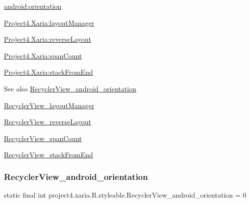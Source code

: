 {\ttfamily \hyperlink{classproject4_1_1xaria_1_1R_1_1styleable_a6b1fb1c1d7e84b9198ebbe7e20465f86}{android\+:orientation}}

{\ttfamily \hyperlink{classproject4_1_1xaria_1_1R_1_1styleable_aa9cec08b1f2e28b73fb9eed845399b00}{Project4.\+Xaria\+:layout\+Manager}}

{\ttfamily \hyperlink{classproject4_1_1xaria_1_1R_1_1styleable_a3ea954156e7ab808e833eaff0274d45f}{Project4.\+Xaria\+:reverse\+Layout}}

{\ttfamily \hyperlink{classproject4_1_1xaria_1_1R_1_1styleable_a7ecd16415effb7a235b31c1193ed8b2f}{Project4.\+Xaria\+:span\+Count}}

{\ttfamily \hyperlink{classproject4_1_1xaria_1_1R_1_1styleable_a1ef8e9797ba63acf022ba0898d24b5a1}{Project4.\+Xaria\+:stack\+From\+End}}

\begin{DoxySeeAlso}{See also}
\hyperlink{classproject4_1_1xaria_1_1R_1_1styleable_a6b1fb1c1d7e84b9198ebbe7e20465f86}{Recycler\+View\+\_\+android\+\_\+orientation} 

\hyperlink{classproject4_1_1xaria_1_1R_1_1styleable_aa9cec08b1f2e28b73fb9eed845399b00}{Recycler\+View\+\_\+layout\+Manager} 

\hyperlink{classproject4_1_1xaria_1_1R_1_1styleable_a3ea954156e7ab808e833eaff0274d45f}{Recycler\+View\+\_\+reverse\+Layout} 

\hyperlink{classproject4_1_1xaria_1_1R_1_1styleable_a7ecd16415effb7a235b31c1193ed8b2f}{Recycler\+View\+\_\+span\+Count} 

\hyperlink{classproject4_1_1xaria_1_1R_1_1styleable_a1ef8e9797ba63acf022ba0898d24b5a1}{Recycler\+View\+\_\+stack\+From\+End} 
\end{DoxySeeAlso}
\mbox{\label{classproject4_1_1xaria_1_1R_1_1styleable_a6b1fb1c1d7e84b9198ebbe7e20465f86}} 
\subsubsection{\texorpdfstring{Recycler\+View\+\_\+android\+\_\+orientation}{RecyclerView\_android\_orientation}}
{\footnotesize\ttfamily static final int project4.\+xaria.\+R.\+styleable.\+Recycler\+View\+\_\+android\+\_\+orientation = 0\hspace{0.3cm}{\ttfamily [static]}}

